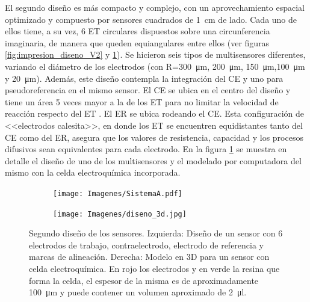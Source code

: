 		 	 El segundo diseño es más compacto y complejo, con un aprovechamiento espacial optimizado y compuesto por sensores cuadrados de \SI{1}{\cm} de lado. Cada uno de ellos tiene, a su vez, 6 ET circulares dispuestos sobre una circunferencia imaginaria, de manera que queden equiangulares entre ellos (ver figuras \ref{fig:impresion_diseno_V2} y \ref{fig:mascara_diseno_v2}). Se hicieron seis tipos de multisensores diferentes, variando el diámetro de los electrodos (con R=\SI{300}{\um}, \SI{200}{\um}, \SI{150}{\um},\SI{100}{\um} y \SI{20}{\um}). Además, este diseño contempla la integración del CE y uno para pseudoreferencia en el mismo sensor. El CE se ubica en el centro del diseño y tiene un área 5 veces mayor a la de los ET para no limitar la velocidad de reacción respecto del ET \cite{Wi2000}. El ER se ubica rodeando el CE. Esta configuración de <<electrodos calesita>>, en donde los ET se encuentren equidistantes tanto del CE como del ER, asegura que los valores de resistencia, capacidad y los procesos difusivos sean equivalentes para cada electrodo.\cite{Bockris1974}  En la figura \ref{fig:mascara_diseno_v2} se muestra en detalle el diseño de uno de los multisensores y el modelado por computadora del mismo con la celda electroquímica incorporada. 

		    	    \begin{figure}[h!]
			 	    \begin{subfigure}[t]{0.395\textwidth}
			       	\texttt{[image: Imagenes/SistemaA.pdf]}
			    	\end{subfigure}
					\begin{subfigure}[t]{0.595\textwidth}
			        \texttt{[image: Imagenes/diseno\_3d.jpg]}
			        \end{subfigure}
			     	\caption[Segundo diseño y máscara de los sensores]{Segundo diseño de los sensores. Izquierda: Diseño de un sensor con 6 electrodos de trabajo, contraelectrodo, electrodo de referencia y marcas de alineación. Derecha: Modelo en 3D para un sensor con celda electroquímica. En rojo los electrodos y en verde la resina que forma la celda, el espesor de la misma es de aproximadamente \SI{100}{\um} y puede contener un volumen aproximado de \SI{2}{\ul}.}
			     	\label{fig:mascara_diseno_v2}
			     	\end{figure}
			 
